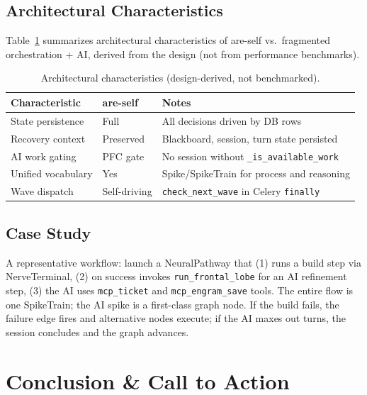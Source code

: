 \documentclass[11pt]{article}
\begin{document}
	\subsection{Architectural Characteristics}
	Table~\ref{tab:arch-char} summarizes architectural characteristics of are-self vs.\ fragmented orchestration + AI, derived from the design (not from performance benchmarks).

	\begin{table}[ht]
		\centering
		\caption{Architectural characteristics (design-derived, not benchmarked).}
		\label{tab:arch-char}
		\small
		\begin{tabular}{@{}lp{1.6cm}p{3.4cm}@{}}
			\toprule
			\textbf{Characteristic} & \textbf{are-self} & \textbf{Notes} \\
			\midrule
			State persistence & Full & All decisions driven by DB rows \cite{talosLiveCodebase} \\
			Recovery context & Preserved & Blackboard, session, turn state persisted \\
			AI work gating & PFC gate & No session without \texttt{\_is\_available\_work} \cite{talosPFC} \\
			Unified vocabulary & Yes & Spike/SpikeTrain for process and reasoning \\
			Wave dispatch & Self-driving & \texttt{check\_next\_wave} in Celery \texttt{finally} \\
			\bottomrule
		\end{tabular}
	\end{table}

	\subsection{Case Study}
	A representative workflow: launch a NeuralPathway that (1) runs a build step via NerveTerminal, (2) on success invokes \texttt{run\_frontal\_lobe} for an AI refinement step, (3) the AI uses \texttt{mcp\_ticket} and \texttt{mcp\_engram\_save} tools. The entire flow is one SpikeTrain; the AI spike is a first-class graph node. If the build fails, the failure edge fires and alternative nodes execute; if the AI maxes out turns, the session concludes and the graph advances.

	\section{Conclusion \& Call to Action}
	\label{sec:conclusion}
\end{document}
